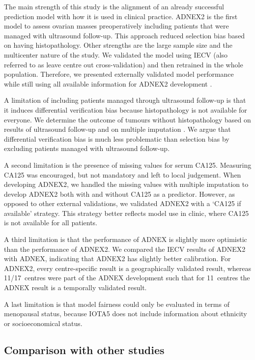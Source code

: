 The main strength of this study is the alignment of an already successful prediction model with how it is used in clinical practice. ADNEX2 is the first model to assess ovarian masses preoperatively including patients that were managed with ultrasound follow-up. This approach reduced selection bias based on having histopathology. Other strengths are the large sample size and the multicenter nature of the study. We validated the model using IECV (also referred to as leave centre out cross-validation) and then retrained in the whole population. Therefore, we presented externally validated model performance while still using all available information for ADNEX2 development \cite{dehondPerspectivesValidationClinical2023}.

A limitation of including patients managed through ultrasound follow-up is that it induces differential verification bias because histopathology is not available for everyone. We determine the outcome of tumours without histopathology based on results of ultrasound follow-up and on multiple imputation \cite{vancalsterValidationModelsDiagnose2020}. We argue that differential verification bias is much less problematic than selection bias by excluding patients managed with ultrasound follow-up.

A second limitation is the presence of missing values for serum \gls{CA125}. Measuring \gls{CA125} was encouraged, but not mandatory and left to local judgement. When developing ADNEX2, we handled the missing values with multiple imputation to develop ADNEX2 both with and without \gls{CA125} as a predictor. However, as opposed to other external validations, we validated ADNEX2 with a `\gls{CA125} if available' strategy. This strategy better reflects model use in clinic, where \gls{CA125} is not available for all patients.

A third limitation is that the performance of \gls{ADNEX} is slightly more optimistic than the performance of ADNEX2. We compared the IECV results of ADNEX2 with \gls{ADNEX}, indicating that ADNEX2 has slightly better calibration. For ADNEX2, every centre-specific result is a geographically validated result, whereas 11/17~centres were part of the \gls{ADNEX} development such that for 11~centres the \gls{ADNEX} result is a temporally validated result.

A last limitation is that model fairness could only be evaluated in terms of menopausal status, because IOTA5 does not include information about ethnicity or socioeconomical status.

\subsection{Comparison with other studies}

